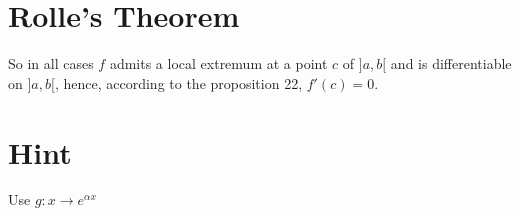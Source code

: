 \documentclass{article}
\newcommand{\comment}[1]{}
\begin{document}
    \comment{
    \section*{Rolle's Thorem}
    Let $f$ be a continuous function on $[a, b]$ and differentiable on $]a, b[$ such that $f(a) = f(b)$. Then there exists $c \in ]a, b[ $ such that $f'(c) = 0$.

    This theorem will be admitted because its proof requires results which are not seen in this course. If $f$ is the constant function, the result is obvious. Otherwise, since $f$ is continuous over $[a, b]$, $f$ is bounded over $[a, b]$
    and reaches its bounds. This means that there exists $m \in  [a, b] $ and $M \in  [a, b] $ such that $\forall x \in  [a, b]$, $f(m) \leqslant  f(x) \leqslant f(M) (f(m) \neq  f(M)$ because $f$ is not a constant function$)$. As $f(a) = f(b)$, then we have the following cases:

    \begin{enumerate}
        \item if $m = a$ or $m = b$, then $M \in  ]a, b[$, hence we have $c = M$;
        \item if $M = a$ or $M = b$, then $m \in  ]a, b[$, hence we have $c = m$;
        \item $m \in  ]a, b[$ and $M \in  ]a, b[$, hence we have $c = m$ or $c = M$.
    \end{enumerate}
    }

    \section{Rolle's Theorem}



    So in all cases $f$ admits a local extremum at a point $c$ of $]a, b[$ and is differentiable on $]a, b[$, hence, according to the proposition 22, $f'(c) = 0$.
    \section*{Hint}
    Use $g : x \rightarrow  e^ {\alpha x} $
\end{document}

